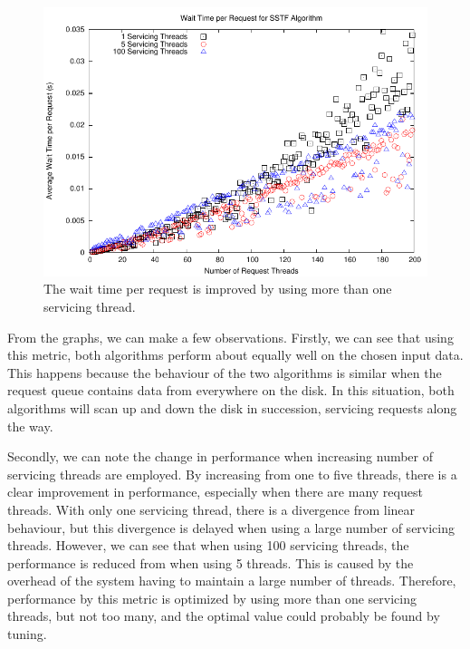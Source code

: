 \documentclass[12pt]{report}
\begin{document}
\begin{figure}[htb!]
    \centering
    \includegraphics[scale=1]{waittimeSSTF.pdf}
    \caption{The wait time per request is improved by using more than one servicing thread.}
    \label{fig:waittimeSSTF}
\end{figure}
From the graphs, we can make a few observations. Firstly, we can see that using this
metric,
both algorithms perform about equally well on the chosen input data.
This happens because
the behaviour of the two algorithms is similar when the request queue
contains data from everywhere on the disk. In this situation, both algorithms will scan up
and down the disk in succession, servicing requests along the way. 

Secondly, we can note
the change in performance when increasing number of servicing threads are employed. By
increasing from one to five threads, there is a clear improvement in  performance,
especially when there are many request threads. With only one servicing thread,
there is a divergence from linear behaviour, but this divergence is delayed when using a
large number of servicing threads. However, we can see that when using 100 servicing threads, the
performance is reduced from when using 5 threads. This is caused by the overhead of
the system having to maintain a large number of threads. Therefore, performance by this
metric is optimized by using more than one servicing threads, but not too many, and the
optimal value could probably be found by tuning.
\end{document}
